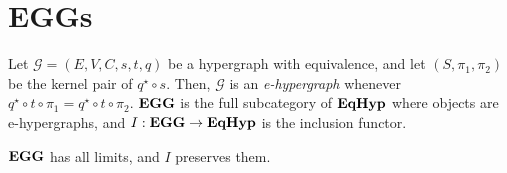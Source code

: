 \section{EGGs}


\begin{definition}
	Let $\mathcal{G} = (E, V, C, s, t, q)$ be a hypergraph with equivalence, and let $(S, \pi_1, \pi_2)$ be the kernel pair of $q^\star \circ s$.
	Then, $\mathcal{G}$ is an \emph{e-hypergraph} whenever $q^\star \circ t \circ \pi_1 = q^\star \circ t \circ \pi_2$.
	$\textbf{\textup{EGG}}$ is the full subcategory of $\textbf{\textup{EqHyp}}$ where objects are e-hypergraphs, and $I: \textbf{\textup{EGG}} \to \textbf{\textup{EqHyp}}$ is the inclusion functor.
\end{definition}

\begin{lemma}
	$\textbf{\textup{EGG}}$ has all limits, and $I$ preserves them.
\end{lemma}

